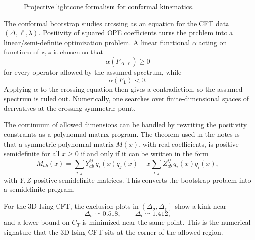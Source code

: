 \begin{figure}[htbp]
\centering
{}
\caption{Projective lightcone formalism for conformal kinematics.}
\end{figure}

The conformal bootstrap studies crossing as an equation for the CFT
data \((\Delta,\ell,\lambda)\).  Positivity of squared OPE coefficients
turns the problem into a linear/semi-definite optimization problem.
A linear functional \(\alpha\) acting on functions of \(z,\bar z\) is
chosen so that
\[
  \alpha(F_{\Delta,\ell})\ge0
\]
for every operator allowed by the assumed spectrum, while
\[
  \alpha(F_{\mathbf1})<0.
\]
Applying \(\alpha\) to the crossing equation then gives a contradiction,
so the assumed spectrum is ruled out.  Numerically, one searches over
finite-dimensional spaces of derivatives at the crossing-symmetric
point.

The continuum of allowed dimensions can be handled by rewriting the
positivity constraints as a polynomial matrix program.  The theorem used
in the notes is that a symmetric polynomial matrix \(M(x)\), with real
coefficients, is positive semidefinite for all \(x\ge0\) if and only if
it can be written in the form
\[
  M_{ab}(x)
  =
  \sum_{i,j} Y^{ij}_{ab}\,q_i(x)q_j(x)
  +
  x\sum_{i,j} Z^{ij}_{ab}\,q_i(x)q_j(x),
\]
with \(Y,Z\) positive semidefinite matrices.  This converts the bootstrap
problem into a semidefinite program.

For the 3D Ising CFT, the exclusion plots in
\((\Delta_\sigma,\Delta_\epsilon)\) show a kink near
\[
  \Delta_\sigma\simeq0.518,\qquad
  \Delta_\epsilon\simeq1.412,
\]
and a lower bound on \(C_T\) is minimized near the same point.  This is
the numerical signature that the 3D Ising CFT sits at the corner of the
allowed region.

